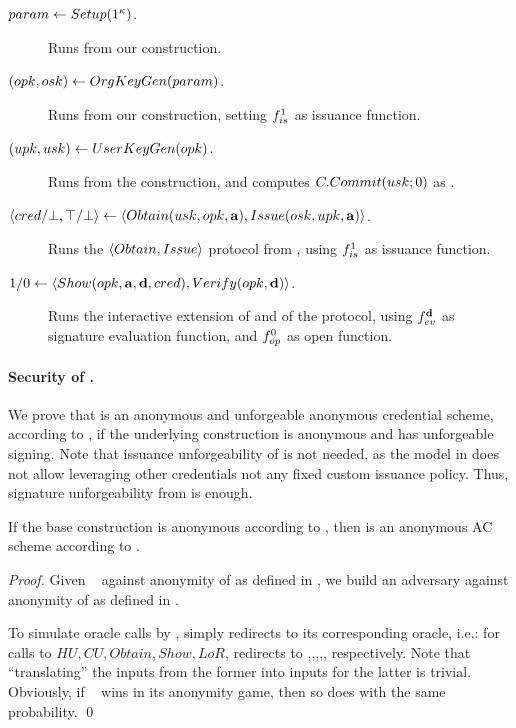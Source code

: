 \begin{description}
\item[$param \gets Setup(1^\kappa)$.] Runs \Setup from our \CUASGen
  construction.
\item[$(opk,osk) \gets OrgKeyGen(param)$.] Runs \IKeyGen from our
  \CUASGen construction, setting $f_{is}^1$ as issuance function.
\item[$(upk,usk) \gets UserKeyGen(opk)$.] Runs \UKeyGen from the
  \CUASGen construction, and computes $C.Commit(usk;0)$ as \upk.
\item[$\langle cred/\bot,\top/\bot \rangle \gets
  \langle Obtain(usk,opk,\mathbf{a}),Issue(osk,upk,\mathbf{a}) \rangle$.]
  Runs the $\langle Obtain,Issue \rangle$ protocol from \CUASGen, using
  $f_{is}^1$ as issuance function.
\item[$1/0 \gets \langle Show(opk,\mathbf{a},\mathbf{d},cred),
  Verify(opk,\mathbf{d}) \rangle$.]
  Runs the interactive extension of \Sign and \Verify of the \CUASGen protocol,
  using $f_{ev}^{\mathbf{d}}$ as signature evaluation function, and $f_{op}^0$ as
  open function.
\end{description}

\paragraph{Security of \CUASAC.} %
We prove that \CUASAC is an anonymous and unforgeable anonymous credential
scheme, according to \cite{fhs19}, if the underlying \CUASGen construction
is anonymous and has unforgeable signing. Note that issuance unforgeability
of \CUASGen is not needed, as the model in \cite{fhs19} does not allow
leveraging other credentials not any fixed custom issuance policy. Thus,
signature unforgeability from \UAS is enough.

\begin{theorem}
  If the base \CUASGen construction is anonymous according to
  , then \CUASAC is an anonymous AC scheme
  according to \cite{fhs19}.
\end{theorem}

\begin{proof}
  Given \adv~ against anonymity of \CUASAC as defined in \cite{fhs19}, we build
  an adversary \advB against anonymity of \CUASGen as defined in
  .

  To simulate oracle calls by \adv, \advB simply redirects to its corresponding
  oracle, i.e.: for calls to $HU,CU,Obtain,Show,LoR$, \advB redirects to
  \HUGEN,\CUGEN,\OBTAIN,\SIGN,\CHALb, respectively. Note that ``translating''
  the inputs from the former into inputs for the latter is trivial.
  Obviously, if \adv~ wins in its anonymity game, then so does \advB with the
  same probability.
  \qed
\end{proof}


